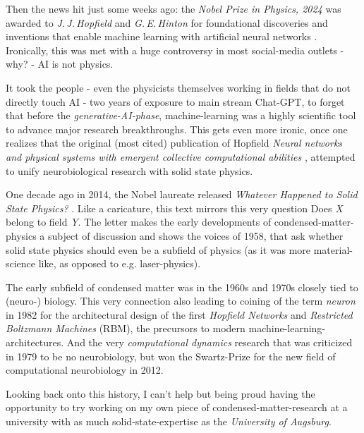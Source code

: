 Then the news hit just some weeks ago: the \emph{Nobel Prize in Physics, 2024} was awarded to \emph{J.\,J.\,Hopfield} and \emph{G.\,E.\,Hinton} \glqq for foundational discoveries and inventions that enable machine learning with artificial neural networks\grqq{} \cite{nobelPrizePhysics2024}.
Ironically, this was met with a huge controversy \cite{NobelPrizeControversy} in most social-media outlets - why? - \glqq AI is not physics\grqq.

It took the people - even the physicists themselves working in fields that do not directly touch AI - two years of exposure to main stream Chat-GPT, to forget that before the \emph{generative-AI-phase}, machine-learning was a highly scientific tool to advance major research breakthroughs.
This gets even more ironic, once one realizes that the original (most cited) publication of Hopfield \emph{\glqq Neural networks and physical systems with emergent collective computational abilities\grqq} \cite{basePaperMachineLearning}, attempted to unify neurobiological research with solid state physics. 

One decade ago in 2014, the Nobel laureate released \emph{\glqq Whatever Happened to Solid State Physics?\grqq} \cite{hopfieldConnectionToSolidStatePhysics}. 
Like a caricature, this text mirrors this very question \glqq Does \emph{X} belong to field \emph{Y}\grqq.
The letter makes the early developments of condensed-matter-physics a subject of discussion and shows the voices of 1958, that ask whether solid state physics should even be a subfield of physics (as it was more material-science like, as opposed to e.g. laser-physics).

The early subfield of condensed matter was in the 1960s and 1970s closely tied to (neuro-) biology. 
This very connection also leading to coining of the term \emph{neuron} in 1982 for the architectural design of the first \emph{Hopfield Networks} and \emph{Restricted Boltzmann Machines} (RBM), the precursors to modern machine-learning-architectures.
And the very \emph{computational dynamics} research that was criticized in 1979 to be \glqq no neurobiology\grqq, but won the Swartz-Prize for the new field of computational neurobiology in 2012.

Looking back onto this history, I can't help but being proud having the opportunity to try working on my own piece of condensed-matter-research at a university with as much solid-state-expertise as the \emph{University of Augsburg}.